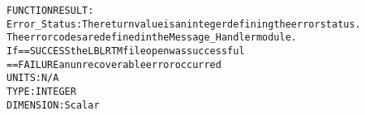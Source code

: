 \begin{alltt}
  FUNCTION RESULT:
        Error_Status: The return value is an integer defining the error status.
                      The error codes are defined in the Message_Handler module.
                      If == SUCCESS the LBLRTM file open was successful
                         == FAILURE an unrecoverable error occurred
                      UNITS:      N/A
                      TYPE:       INTEGER
                      DIMENSION:  Scalar
 
  \end{alltt}
